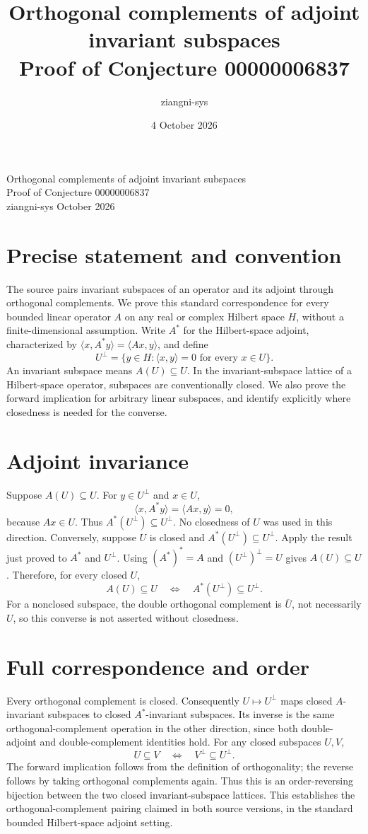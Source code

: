 \documentclass[10pt,a4paper]{article}
\title{Orthogonal complements of adjoint invariant subspaces\\\large Proof of Conjecture 00000006837}
\author{ziangni-sys}
\date{4 October 2026}
\begin{document}
\begin{center}
{\Large Orthogonal complements of adjoint invariant subspaces}\\[4pt]
{\large Proof of Conjecture 00000006837}\\[6pt]
ziangni-sys  October 2026
\end{center}
\section*{Precise statement and convention}
The source pairs invariant subspaces of an operator and its adjoint
through orthogonal complements. We prove this standard correspondence
for every bounded linear operator $A$ on any real or complex Hilbert
space $H$, without a finite-dimensional assumption.
Write $A^*$ for the Hilbert-space adjoint, characterized by
$\langle x,A^*y\rangle=\langle Ax,y\rangle$, and define
\[
U^\perp=\{y\in H:\langle x,y\rangle=0\text{ for every }x\in U\}.
\]
An invariant subspace means $A(U)\subseteq U$.
In the invariant-subspace lattice of a Hilbert-space operator,
subspaces are conventionally closed. We also prove the forward
implication for arbitrary linear subspaces, and identify explicitly
where closedness is needed for the converse.

\section*{Adjoint invariance}
Suppose $A(U)\subseteq U$. For $y\in U^\perp$ and $x\in U$,
\[
\langle x,A^*y\rangle=\langle Ax,y\rangle=0,
\]
because $Ax\in U$. Thus $A^*(U^\perp)\subseteq U^\perp$.
No closedness of $U$ was used in this direction.
Conversely, suppose $U$ is closed and $A^*(U^\perp)\subseteq U^\perp$.
Apply the result just proved to $A^*$ and $U^\perp$.
Using $(A^*)^*=A$ and $(U^\perp)^\perp=U$ gives $A(U)\subseteq U$.
Therefore, for every closed $U$,
\[
 A(U)\subseteq U \quad\Longleftrightarrow\quad
 A^*(U^\perp)\subseteq U^\perp.
\]
For a nonclosed subspace, the double orthogonal complement is
$\overline U$, not necessarily $U$, so this converse is not asserted
without closedness.

\section*{Full correspondence and order}
Every orthogonal complement is closed. Consequently
$U\mapsto U^\perp$ maps closed $A$-invariant subspaces to closed
$A^*$-invariant subspaces. Its inverse is the same orthogonal-complement
operation in the other direction, since both double-adjoint and
double-complement identities hold.
For any closed subspaces $U,V$,
\[
U\subseteq V\quad\Longleftrightarrow\quad V^\perp\subseteq U^\perp.
\]
The forward implication follows from the definition of orthogonality;
the reverse follows by taking orthogonal complements again.
Thus this is an order-reversing bijection between the two closed
invariant-subspace lattices. This establishes the orthogonal-complement
pairing claimed in both source versions, in the standard bounded
Hilbert-space adjoint setting.
\end{document}
